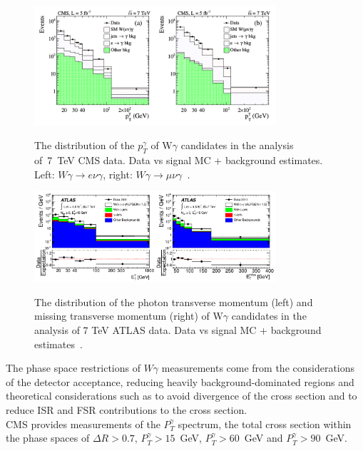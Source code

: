 \begin{figure}[htb]
  \begin{center}
    {\includegraphics[width=0.80\textwidth]{../figs/WgAbout/Wg7TeV_CMS_ptGamma.png}}
    \caption{The distribution of the $p_T^\gamma$ of W$\gamma$ candidates in the analysis of~7~TeV CMS data. Data vs signal MC + background estimates. Left: $W\gamma\rightarrow e\nu\gamma$, right: $W\gamma\rightarrow \mu\nu\gamma$~\cite{ref_7TeV_CMS}.}
    \label{fig:Wg7TeV_CMS_ptGamma}
  \end{center}
\end{figure}
\begin{figure}[htb]
  \begin{center}
    {\includegraphics[width=0.80\textwidth]{../figs/WgAbout/Wg7TeV_ATLAS_ptGamma.png}}
    \caption{The distribution of the photon transverse momentum (left) and missing transverse momentum (right) of W$\gamma$ candidates in the analysis of 7 TeV ATLAS data. Data vs signal MC + background estimates~\cite{ref_7TeV_ATLAS}. }
    \label{fig:Wg7TeV_ATLAS_ptGamma}
  \end{center}
\end{figure}
The phase space restrictions of $W\gamma$ measurements come from the considerations of the detector acceptance, reducing heavily background-dominated regions and theoretical considerations such as to avoid divergence of the cross section and to reduce ISR and FSR contributions to the cross section.\\
CMS provides measurements of the $P_T^\gamma$ spectrum, the total cross section within the phase spaces of $\Delta R>0.7$, $P_T^\gamma>15$~GeV, $P_T^\gamma>60$~GeV and $P_T^\gamma>90$~GeV.\\
